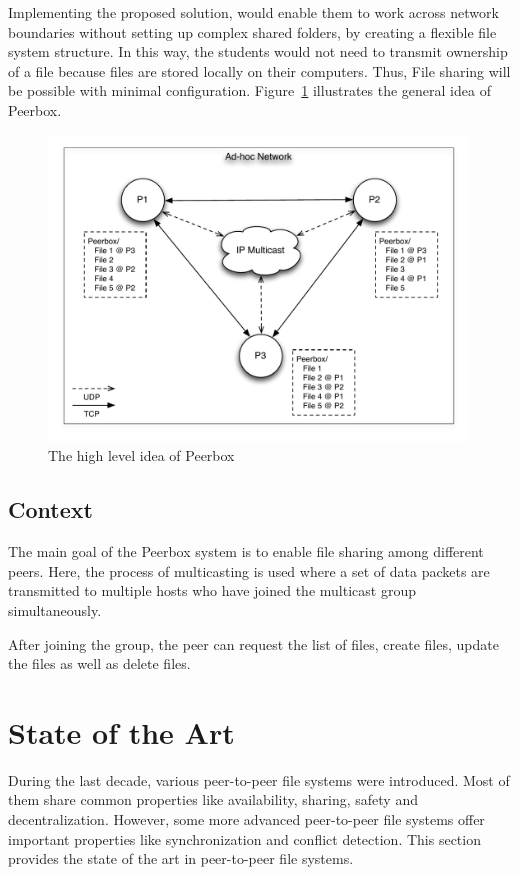 Implementing the proposed solution, would  enable them to work across network boundaries without setting up complex shared folders, by creating a flexible file system structure. In this way, the students would not need to transmit ownership of a file because  files are stored locally on their computers. Thus, File sharing will be possible with minimal configuration. Figure~\ref{fig:idea} illustrates the general idea of Peerbox.

 
\begin{figure}[H]
\begin{center}
\includegraphics[height=3.2in]{figures/idea.pdf}
\caption{The high level idea of Peerbox}
\label{fig:idea}
\end{center}
\end{figure}



\subsection{Context}
The main goal of the Peerbox system is to enable file sharing among different peers. Here, the process of multicasting is used where a set of data packets are transmitted to  multiple hosts who have joined the multicast group simultaneously. 

After joining the group, the peer can request the list of files, create files, update the files as well as delete files.


\clearpage
\section{State of the Art}

During the last decade, various peer-to-peer file systems were introduced. Most of them share common properties like availability, sharing, safety and decentralization. However, some more advanced peer-to-peer file systems offer important properties like synchronization and conflict detection. This section provides the state of the art in peer-to-peer file systems.

